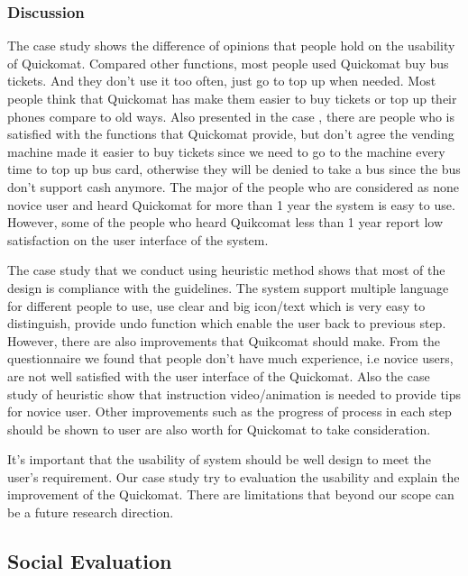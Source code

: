 \documentclass[twocolumn]{article}
\begin{document}
\subsubsection{Discussion}
The case study shows the difference of opinions that people hold on the usability of Quickomat. Compared other functions, most people used Quickomat buy bus tickets. And they don’t use it too often, just go to top up when needed. Most people think that Quickomat has make them easier to buy tickets or top up their phones compare to old ways. Also presented in the case , there are people who is satisfied with the functions that Quickomat provide, but don’t agree the vending machine made it easier to buy tickets since we need to go to the machine every time to top up bus card, otherwise they will be denied to take a bus since the bus don’t support cash anymore. The major of the people who are considered as none novice user and heard Quickomat for more than 1 year the system is easy to use. However, some of the people who heard Quikcomat less than 1 year report low satisfaction on the user interface of the system.

The case study that we conduct using heuristic method shows that most of the design is compliance with the guidelines. The system support multiple language for different people to use, use clear and big icon/text which is very easy to distinguish, provide undo function which enable the user back to previous step. However, there are also improvements that Quikcomat should make. From the questionnaire we found that people don’t have much experience, i.e novice users, are not well satisfied with the user interface of the Quickomat. Also the case study of heuristic show that instruction video/animation is needed to provide tips for novice user. Other improvements such as the progress of process in each step should be shown to user are also worth for Quickomat to take consideration.

It’s important that the usability of system should be well design to meet the user’s requirement. Our case study try to evaluation the usability and explain the improvement of the Quickomat. There are limitations that beyond our scope can be a future research direction.

\subsection{Social Evaluation}
\end{document}
